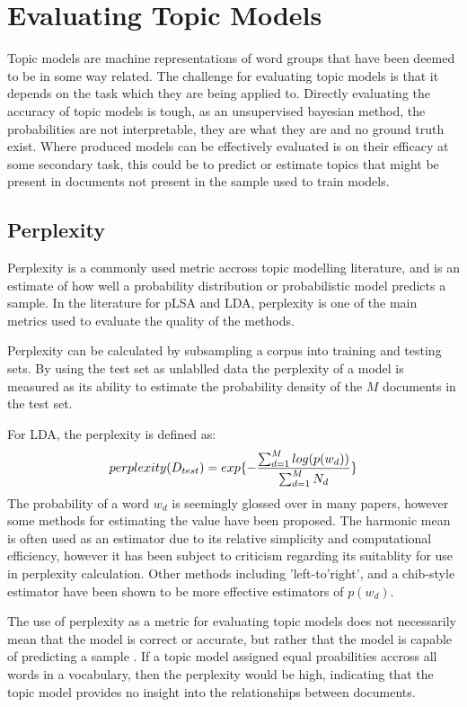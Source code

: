 \documentclass[10pt]{report}
\begin{document}
\section{Evaluating Topic Models}
Topic models are machine representations of word groups that have been deemed to be in some way related. The challenge for evaluating topic models is that it depends on the task which they are being applied to. Directly evaluating the accuracy of topic models is tough, as an unsupervised bayesian method, the probabilities are not interpretable, they are what they are and no ground truth exist. Where produced models can be effectively evaluated is on their efficacy at some secondary task, this could be to predict or estimate topics that might be present in documents not present in the sample used to train models.

\subsection{Perplexity}
Perplexity is a commonly used metric accross topic modelling literature, and is an estimate of how well a probability distribution or probabilistic model predicts a sample. In the literature for pLSA and LDA, perplexity is one of the main metrics used to evaluate the quality of the methods.~\cite{Blei2003-dj,Hofmann1999-qb} 

Perplexity can be calculated by subsampling a corpus into training and testing sets. By using the test set as unlablled data the perplexity of a model is measured as its ability to estimate the probability density of the \(M\) documents in the test set.

\renewcommand{\baselinestretch}{1.0}\normalsize
For LDA, the perplexity is defined as:
\[
  perplexity(D_{test}) = exp\{-{{\sum^{M}_{d=1} log(p(w_d))}\over{\sum^{M}_{d=1} N_d}}\}
\]
\renewcommand{\baselinestretch}{2.0}\normalsize
The probability of a word \(w_d\) is seemingly glossed over in many papers, however some methods for estimating the value have been proposed. The harmonic mean is often used as an estimator due to its relative simplicity and computational efficiency, however it has been subject to criticism regarding its suitablity for use in perplexity calculation. Other methods including 'left-to'right', and a chib-style estimator have been shown to be more effective estimators of $p(w_d)$.~\cite{Newton1994-ws,Wallach2008-ti,Chib1995-wq,Wallach2009-ot}

The use of perplexity as a metric for evaluating topic models does not necessarily mean that the model is correct or accurate, but rather that the model is capable of predicting a sample
. If a topic model assigned equal proabilities accross all words in a vocabulary, then the perplexity would be high, indicating that the topic model provides no insight into the relationships between documents.
\end{document}
